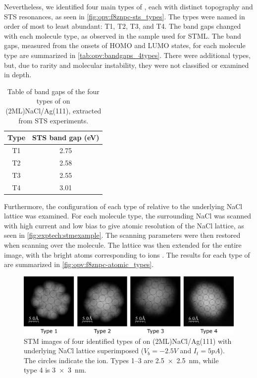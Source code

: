 Nevertheless, we identified four main types of , each with distinct topography and \ac{STS} resonances, as seen in \autoref{fig:opv:f8znpc-sts_types}. The types were named in order of most to least abundant: T1, T2, T3, and T4. The band gaps changed with each molecule type, as observed in the sample used for \ac{STML}. The band gaps, measured from the onsets of HOMO and LUMO states, for each molecule type are summarized in \autoref{tab:opv:bandgaps_4types}. There were additional types, but, due to rarity and molecular instability, they were not classified or examined in depth. 

\begin{table}[H]
\begin{center}
    \begin{tabular}{|c|c|} 
    \hline
        Type  & STS band gap (eV) \\
        \hline
        T1  &    2.75  \\
        T2  &    2.58  \\
        T3  &    2.55\\
        T4  &    3.01\\
        \hline
    \end{tabular}
    \caption{Table of band gaps of the four types of  on (2ML)NaCl/Ag(111), extracted from STS experiments.}
    \label{tab:opv:bandgaps_4types}
    \end{center}
\end{table}

Furthermore, the configuration of each type of  relative to the underlying NaCl lattice was examined. For each molecule type, the surrounding NaCl was scanned with high current and low bias to give atomic resolution of the NaCl lattice, as seen in \autoref{fig:exptech:stmexample}. The scanning parameters were then restored when scanning over the molecule. The lattice was then extended for the entire image, with the bright atoms corresponding to  ions \citep{heidorn2013influence}. The results for each type of  are summarized in \autoref{fig:opv:f8znpc-atomic_types}.

\begin{figure} [h]
    \centering
        \includegraphics[width=\textwidth]{pictures/4types_atomic.png}
    \caption{STM images of four identified types of  on (2ML)NaCl/Ag(111) with underlying NaCl lattice superimposed ($V_b = -2.5V$ and $I_t = 5pA$). The circles indicate the  ion. Types 1--3 are \SI{2.5x2.5}{nm}, while type 4 is \SI{3x3}{nm}.  }
    \label{fig:opv:f8znpc-atomic_types}
\end{figure}

